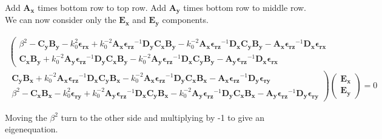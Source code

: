 \documentclass[]{article}
\begin{document}
Add $\mathbf{A_x}$ times bottom row to top row. Add $\mathbf{A_y}$ times bottom row to middle row. We can now consider only the $\mathbf{E_x}$ and $\mathbf{E_y}$ components.

\begin{multline*}
\left(
\begin{matrix}
\beta^2 - \mathbf{C_y} \mathbf{B_y} - k_0^2 \mathbf{\epsilon_{rx}} + k_0^{-2} \mathbf{A_x} \mathbf{\epsilon_{rz}}^{-1} \mathbf{D_y} \mathbf{C_x} \mathbf{B_y} - k_0^{-2} \mathbf{A_x} \mathbf{\epsilon_{rz}}^{-1} \mathbf{D_x} \mathbf{C_y} \mathbf{B_y} -  \mathbf{A_x} \mathbf{\epsilon_{rz}}^{-1} \mathbf{D_x} \mathbf{\epsilon_{rx}}
\\
\mathbf{C_x} \mathbf{B_y} + k_0^{-2} \mathbf{A_y} \mathbf{\epsilon_{rz}}^{-1} \mathbf{D_y} \mathbf{C_x} \mathbf{B_y} - k_0^{-2} \mathbf{A_y} \mathbf{\epsilon_{rz}}^{-1} \mathbf{D_x} \mathbf{C_y} \mathbf{B_y} -  \mathbf{A_y} \mathbf{\epsilon_{rz}}^{-1} \mathbf{D_x} \mathbf{\epsilon_{rx}}
\end{matrix}
\right.
\\
\left.
\begin{matrix}
\mathbf{C_y} \mathbf{B_x} + k_0^{-2} \mathbf{A_x} \mathbf{\epsilon_{rz}}^{-1} \mathbf{D_x} \mathbf{C_y} \mathbf{B_x} - k_0^{-2} \mathbf{A_x} \mathbf{\epsilon_{rz}}^{-1} \mathbf{D_y} \mathbf{C_x}\mathbf{B_x} - \mathbf{A_x} \mathbf{\epsilon_{rz}}^{-1} \mathbf{D_y} \mathbf{\epsilon_{ry}} 
\\
\beta^2 - \mathbf{C_x} \mathbf{B_x} - k_0^2  \mathbf{\epsilon_{ry}} + k_0^{-2} \mathbf{A_y} \mathbf{\epsilon_{rz}}^{-1} \mathbf{D_x} \mathbf{C_y} \mathbf{B_x} - k_0^{-2} \mathbf{A_y} \mathbf{\epsilon_{rz}}^{-1} \mathbf{D_y} \mathbf{C_x}\mathbf{B_x} - \mathbf{A_y} \mathbf{\epsilon_{rz}}^{-1} \mathbf{D_y} \mathbf{\epsilon_{ry}} 
\end{matrix}
\right)
\begin{pmatrix}
\mathbf{E_x} \\
\mathbf{E_y}
\end{pmatrix}
=0
\end{multline*}

Moving the $\beta^2$ turn to the other side and multiplying by -1 to give an eigenequation.
\end{document}
